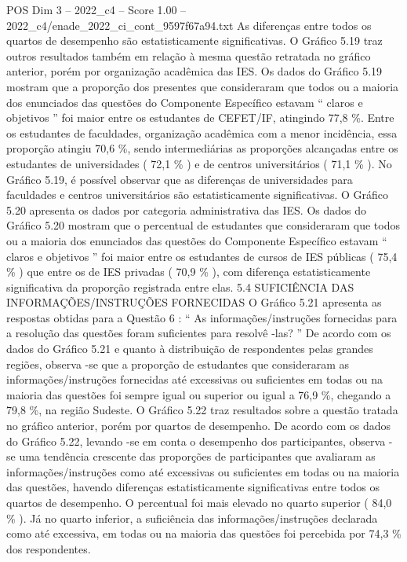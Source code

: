\begin{textsample}{POS Dim 3 – 2022\_c4 – Score 1.00 – 2022\_c4/enade\_2022\_ci\_cont\_9597f67a94.txt}
As diferenças entre todos os quartos de desempenho são estatisticamente significativas.
O Gráfico 5.19 traz outros resultados também em relação à mesma questão retratada no gráfico anterior, porém por organização acadêmica das IES.
Os dados do Gráfico 5.19 mostram que a proporção dos presentes que consideraram que todos ou a maioria dos enunciados das questões do Componente Específico estavam “ claros e objetivos ” foi maior entre os estudantes de CEFET/IF, atingindo 77,8 \%.
Entre os estudantes de faculdades, organização acadêmica com a menor incidência, essa proporção atingiu 70,6 \%, sendo intermediárias as proporções alcançadas entre os estudantes de universidades ( 72,1 \% ) e de centros universitários ( 71,1 \% ).
No Gráfico 5.19, é possível observar que as diferenças de universidades para faculdades e centros universitários são estatisticamente significativas.
O Gráfico 5.20 apresenta os dados por categoria administrativa das IES.
Os dados do Gráfico 5.20 mostram que o percentual de estudantes que consideraram que todos ou a maioria dos enunciados das questões do Componente Específico estavam “ claros e objetivos ” foi maior entre os estudantes de cursos de IES públicas ( 75,4 \% ) que entre os de IES privadas ( 70,9 \% ), com diferença estatisticamente significativa da proporção registrada entre elas. 5.4 SUFICIÊNCIA DAS INFORMAÇÕES/INSTRUÇÕES FORNECIDAS O Gráfico 5.21 apresenta as respostas obtidas para a Questão 6 : “ As informações/instruções fornecidas para a resolução das questões foram suficientes para resolvê -las? ” De acordo com os dados do Gráfico 5.21 e quanto à distribuição de respondentes pelas grandes regiões, observa -se que a proporção de estudantes que consideraram as informações/instruções fornecidas até excessivas ou suficientes em todas ou na maioria das questões foi sempre igual ou superior ou igual a 76,9 \%, chegando a 79,8 \%, na região Sudeste.
O Gráfico 5.22 traz resultados sobre a questão tratada no gráfico anterior, porém por quartos de desempenho.
De acordo com os dados do Gráfico 5.22, levando -se em conta o desempenho dos participantes, observa -se uma tendência crescente das proporções de participantes que avaliaram as informações/instruções como até excessivas ou suficientes em todas ou na maioria das questões, havendo diferenças estatisticamente significativas entre todos os quartos de desempenho.
O percentual foi mais elevado no quarto superior ( 84,0 \% ).
Já no quarto inferior, a suficiência das informações/instruções declarada como até excessiva, em todas ou na maioria das questões foi percebida por 74,3 \% dos respondentes.

\end{textsample}
